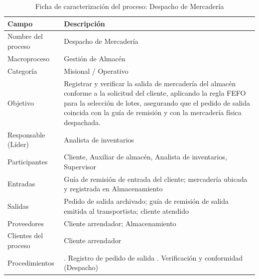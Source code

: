 \documentclass[11pt, a4paper, oneside]{report}
\begin{document}
\begin{table}[H]
\centering\small
\renewcommand{\arraystretch}{1.35}
\setlength{\tabcolsep}{6pt}
\begin{tabularx}{\textwidth}{|>{\raggedright\arraybackslash}p{}|>{\raggedright\arraybackslash}X|}
\hline
\rowcolor{upeu_dark}
\color{white}\bfseries Campo & \color{white}\bfseries Descripción \\ \hline
\rowcolor{gray!10}
Nombre del proceso & Despacho de Mercadería \\ \hline
Macroproceso & Gestión de Almacén \\ \hline
\rowcolor{gray!10}
Categoría & Misional / Operativo \\ \hline
Objetivo & Registrar y verificar la salida de mercadería del almacén conforme a la solicitud del cliente, aplicando la regla FEFO para la selección de lotes, asegurando que el pedido de salida coincida con la guía de remisión y con la mercadería física despachada. \\ \hline
\rowcolor{gray!10}
Responsable (Líder) & Analista de inventarios \\ \hline
Participantes & Cliente, Auxiliar de almacén, Analista de inventarios, Supervisor \\ \hline
\rowcolor{gray!10}
Entradas & Guía de remisión de entrada del cliente; mercadería ubicada y registrada en Almacenamiento \\ \hline
Salidas & Pedido de salida archivado; guía de remisión de salida emitida al transportista; cliente atendido \\ \hline
\rowcolor{gray!10}
Proveedores & Cliente arrendador; Almacenamiento \\ \hline
Clientes del proceso & Cliente arrendador \\ \hline
\rowcolor{gray!10}
Procedimientos & 1. Registro de pedido de salida \newline 2. Verificación y conformidad (Despacho) \\ \hline
\end{tabularx}
\caption{Ficha de caracterización del proceso: Despacho de Mercadería}
\end{table}
\end{document}
